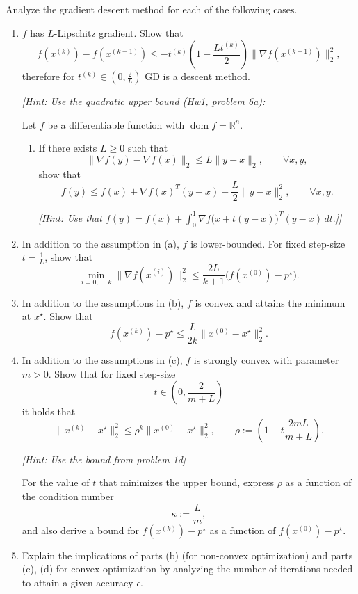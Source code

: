 \documentclass[11pt,letter,notitlepage]{article}
\theoremstyle{definition}
\begin{document}
\begin{exercise}
Analyze the gradient descent method for each of the following cases.

\begin{enumerate}[label=(\alph*)]
    \item $f$ has $L$-Lipschitz gradient. Show that
    \[
    f(x^{(k)}) - f(x^{(k-1)})
    \le
    -t^{(k)}
    \left(1 - \frac{L t^{(k)}}{2}\right)
    \|\nabla f(x^{(k-1)})\|_2^2,
    \]
    therefore for $t^{(k)} \in \left(0,\frac{2}{L}\right)$ GD is a descent method.

    \textit{[Hint: Use the quadratic upper bound (Hw1, problem 6a):}

Let $f$ be a differentiable function with $\operatorname{dom} f = \mathbb{R}^n$.

\begin{enumerate}[label=(\alph*)]
    \item If there exists $L \ge 0$ such that
    \[
    \|\nabla f(y)-\nabla f(x)\|_2 \le L\|y-x\|_2,
    \qquad \forall x,y,
    \]
    show that
    \[
    f(y) \le f(x)+\nabla f(x)^T(y-x)+\frac{L}{2}\|y-x\|_2^2,
    \qquad \forall x,y.
    \]

    \textit{[Hint: Use that
    $
    f(y)=f(x)+\int_0^1 \nabla f\bigl(x+t(y-x)\bigr)^T (y-x)\,dt.
    $]]}
\end{enumerate}

    \item In addition to the assumption in (a), $f$ is lower-bounded. For fixed step-size $t=\frac{1}{L}$, show that
    \[
    \min_{i=0,\ldots,k} \|\nabla f(x^{(i)})\|_2^2
    \le
    \frac{2L}{k+1}\bigl(f(x^{(0)}) - p^\star\bigr).
    \]

    \item In addition to the assumptions in (b), $f$ is convex and attains the minimum at $x^\star$. Show that
    \[
    f(x^{(k)}) - p^\star
    \le
    \frac{L}{2k}\|x^{(0)} - x^\star\|_2^2.
    \]

    \item In addition to the assumptions in (c), $f$ is strongly convex with parameter $m>0$. Show that for fixed step-size
    \[
    t \in \left(0,\frac{2}{m+L}\right)
    \]
    it holds that
    \[
    \|x^{(k)} - x^\star\|_2^2
    \le
    \rho^k \|x^{(0)} - x^\star\|_2^2,
    \qquad
    \rho := \left(1 - t\frac{2mL}{m+L}\right).
    \]

    \textit{[Hint: Use the bound from problem 1d]}

    For the value of $t$ that minimizes the upper bound, express $\rho$ as a function of the condition number
    \[
    \kappa := \frac{L}{m},
    \]
    and also derive a bound for $f(x^{(k)}) - p^\star$ as a function of $f(x^{(0)}) - p^\star$.

    \item Explain the implications of parts (b) (for non-convex optimization) and parts (c), (d) for convex optimization by analyzing the number of iterations needed to attain a given accuracy $\epsilon$.
\end{enumerate}
\end{exercise}
\end{document}
